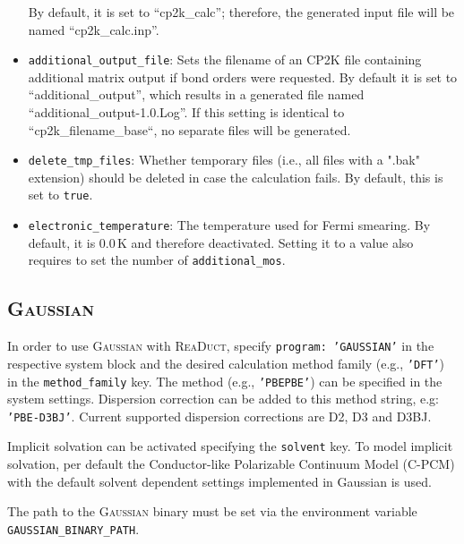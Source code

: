 \documentclass[]{tufte-book}
\begin{document}
\begin{itemize}
	By default, it is set to ``cp2k\_calc''; therefore, the generated input file will be named ``cp2k\_calc.inp''.
	\item \texttt{additional\_output\_file}: Sets the filename of an \textsc{CP2K} file containing additional matrix output if bond orders were requested.
	By default it is set to ``additional\_output'', which results in a generated file named ``additional\_output-1.0.Log''. If this setting is identical to ``cp2k\_filename\_base``, no separate files will be generated.
	\item \texttt{delete\_tmp\_files}: Whether temporary files (i.e., all files with a ".bak" extension) should be deleted in case
	the calculation fails. By default, this is set to \texttt{true}.
	\item \texttt{electronic\_temperature}: The temperature used for Fermi smearing. By default, it is 0.0\,K and therefore deactivated. Setting it to a value also requires to set the number of \texttt{additional\_mos}.
\end{itemize}

\subsection{\textsc{Gaussian}}

In order to use \textsc{Gaussian} with \textsc{ReaDuct}, specify \texttt{program: 'GAUSSIAN'} in the respective system block and the desired
calculation method family (e.g., \texttt{'DFT'}) in the \texttt{method\_family} key.
The method (e.g., \texttt{'PBEPBE'}) can be specified in the system settings. Dispersion correction can be added to this method string, e.g: \texttt{'PBE-D3BJ'}. Current supported dispersion corrections are D2, D3\cite{grimmeD3} and D3BJ.\cite{bjDamping}

Implicit solvation can be activated specifying the \texttt{solvent} key.
To model implicit solvation, per default the Conductor-like Polarizable Continuum Model\cite{cpcm} (C-PCM) with the default solvent dependent settings implemented in Gaussian is used.

The path to the \textsc{Gaussian} binary must be set via the environment variable \texttt{GAUSSIAN\_BINARY\_PATH}.
\end{document}
